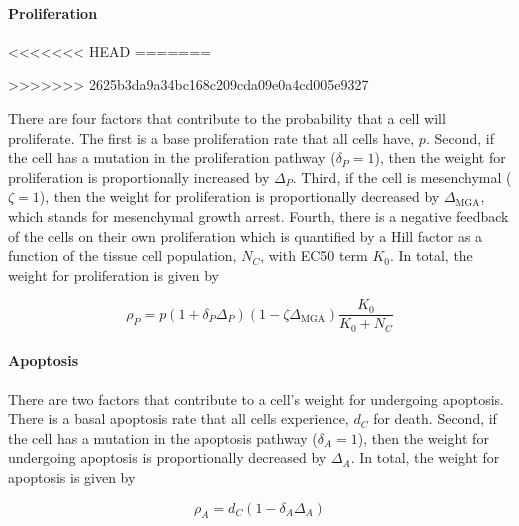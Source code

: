 \documentclass[11pt]{article}
\newcommand{\tcr} { \textcolor{red} }
\begin{document}
\paragraph{Proliferation}
<<<<<<< HEAD
=======

>>>>>>> 2625b3da9a34bc168c209cda09e0a4cd005e9327
  
There are four factors that contribute to the probability that a cell will proliferate.
The first is a base proliferation rate that all cells have, $p$.
Second, if the cell has a mutation in the proliferation pathway ($\delta_P=1$), then the weight for proliferation is proportionally increased by $\Delta_P$.
Third, if the cell is mesenchymal ($\zeta=1$), then the weight for proliferation is proportionally decreased by $\Delta_{\text{MGA}}$, which stands for mesenchymal growth arrest.
Fourth, there is a negative feedback of the cells on their own proliferation which is quantified by a Hill factor as a function of the tissue cell population, $N_C$, with EC50 term $K_0$.
In total, the weight for proliferation is given by

\begin{equation}\tag{2.1}
\rho_P = p(1+\delta_{P}\Delta_P)(1-\zeta \Delta_{\text{MGA}})\frac{K_0}{K_0+N_C}
\end{equation}

\paragraph{Apoptosis}
There are two factors that contribute to a cell's weight for undergoing apoptosis.
There is a basal apoptosis rate that all cells experience, $d_C$ for death.
Second, if the cell has a mutation in the apoptosis pathway ($\delta_A=1$), then the weight for undergoing apoptosis is proportionally decreased by $\Delta_A$.
In total, the weight for apoptosis is given by 

\begin{equation}\tag{2.2}
\rho_A = d_C(1-\delta_{A}\Delta_A)
\end{equation}
\end{document}

